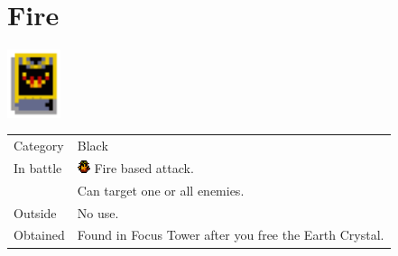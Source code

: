 \section{Fire}
\label{spell:fire}

\includegraphics[height=2cm,keepaspectratio]{./resources/spells/fire}

\begin{longtable}{ l p{9cm} }
	Category
	& Black
\\ %
	In battle
	& \includegraphics[height=1em,keepaspectratio]{./resources/effects/fire} Fire based attack. \\
	& Can target one or all enemies.
\\ %
	Outside
	& No use.
\\ %
	Obtained
	& Found in Focus Tower after you free the Earth Crystal.
\end{longtable}

